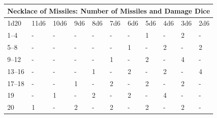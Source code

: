 \noindent
\begin{tabular}{|p{}|p{}|p{}|p{}|p{}|p{}|p{}|p{}|p{}|p{}|p{}|}
\multicolumn{11}{c}{Necklace of Missiles: Number of Missiles and Damage Dice} \\
\hline
1d20	& 11d6	& 10d6	& 9d6	& 8d6	& 7d6	& 6d6	& 5d6	& 4d6	& 3d6	& 2d6 \\
\hline\hline
\rowcolor[gray]{.9}1--4	& -	& -	& -	& -	& -	& -	& 1	& -	& 2	& - \\
5--8	& -	& -	& -	& -	& -	& 1	& -	& 2	& -	& 2 \\
\rowcolor[gray]{.9}9--12	& -	& -	& -	& -	& 1	& -	& 2	& -	& 4	& - \\
13--16	& -	& -	& -	& 1	& -	& 2	& -	& 2	& -	& 4 \\
\rowcolor[gray]{.9}17--18	& -	& -	& 1	& -	& 2	& -	& 2	& -	& 2	& - \\
19		& -	& 1	& -	& 2	& -	& 2	& -	& 4	& -	& - \\
\rowcolor[gray]{.9}20		& 1	& -	& 2	& -	& 2	& -	& 2	& -	& 2	& - \\
\hline
\end{tabular}

